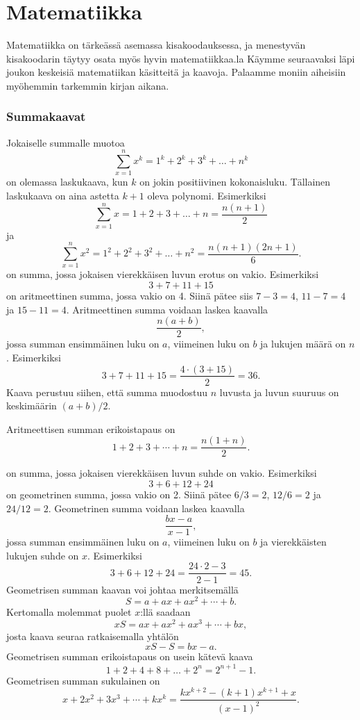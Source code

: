 \section{Matematiikka}

Matematiikka on tärkeässä asemassa kisakoodauksessa,
ja menestyvän kisakoodarin täytyy osata myös
hyvin matematiikkaa.la
Käymme seuraavaksi läpi joukon keskeisiä
matematiikan käsitteitä ja kaavoja.
Palaamme moniin aiheisiin myöhemmin tarkemmin kirjan aikana.

\subsubsection{Summakaavat}

Jokaiselle summalle muotoa
\[\sum_{x=1}^n x^k = 1^k+2^k+3^k+\ldots+n^k\]
on olemassa laskukaava,
kun $k$ on jokin positiivinen kokonaisluku.
Tällainen laskukaava on aina astetta $k+1$
oleva polynomi. Esimerkiksi
\[\sum_{x=1}^n x = 1+2+3+\ldots+n = \frac{n(n+1)}{2}\]
ja
\[\sum_{x=1}^n x^2 = 1^2+2^2+3^2+\ldots+n^2 = \frac{n(n+1)(2n+1)}{6}.\]
\noindent
{} on summa, 
jossa jokaisen vierekkäisen luvun erotus on vakio.
Esimerkiksi
\[3+7+11+15\]
on aritmeettinen summa,
jossa vakio on 4.
Siinä pätee siis $7-3=4$, $11-7=4$ ja $15-11=4$.
Aritmeettinen summa voidaan laskea kaavalla
\[\frac{n(a+b)}{2},\]
jossa summan ensimmäinen luku on $a$,
viimeinen luku on $b$ ja lukujen määrä on $n$.
Esimerkiksi
\[3+7+11+15=\frac{4 \cdot (3+15)}{2} = 36.\]
Kaava perustuu siihen, että summa muodostuu $n$ luvusta
ja luvun suuruus on keskimäärin $(a+b)/2$.

Aritmeettisen summan erikoistapaus on
\[1+2+3+\cdots+n = \frac{n(1+n)}{2}.\]

\noindent
{} on summa,
jossa jokaisen vierekkäisen luvun suhde on vakio.
Esimerkiksi
\[3+6+12+24\]
on geometrinen summa,
jossa vakio on 2.
Siinä pätee $6/3=2$, $12/6=2$ ja $24/12=2$.
Geometrinen summa voidaan laskea kaavalla
\[\frac{bx-a}{x-1},\]
jossa summan ensimmäinen luku on $a$,
viimeinen luku on $b$ ja vierekkäisten lukujen suhde on $x$.
Esimerkiksi
\[3+6+12+24=\frac{24 \cdot 2 - 3}{2-1} = 45.\]
Geometrisen summan kaavan voi johtaa merkitsemällä
\[ S = a + ax + ax^2 + \cdots + b .\] 
Kertomalla molemmat puolet $x$:llä saadaan
\[ xS = ax + ax^2 + ax^3 + \cdots + bx,\]
josta kaava seuraa ratkaisemalla yhtälön
\[ xS-S = bx-a.\]
Geometrisen summan erikoistapaus on usein kätevä kaava
\[1+2+4+8+\ldots+2^n=2^{n+1}-1.\]
Geometrisen summan sukulainen on
\[x+2x^2+3x^3+\cdots+k x^k = \frac{kx^{k+2}-(k+1)x^{k+1}+x}{(x-1)^2}. \]

